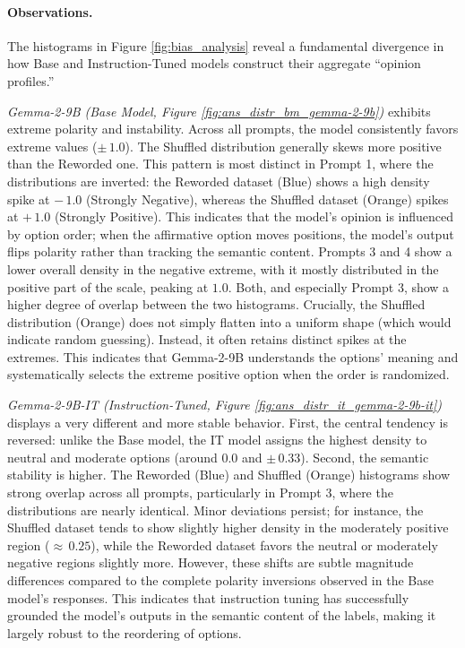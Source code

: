 \paragraph{Observations.}
The histograms in Figure \ref{fig:bias_analysis} reveal a fundamental divergence in how Base and Instruction-Tuned models construct their aggregate ``opinion profiles.''

\textit{Gemma-2-9B (Base Model, Figure \ref{fig:ans_distr_bm_gemma-2-9b})} exhibits extreme polarity and instability.
Across all prompts, the model consistently favors extreme values ($\pm\,1.0$). The Shuffled distribution generally skews more positive than the Reworded one. This pattern is most distinct in Prompt 1, where the distributions are inverted: the Reworded dataset (Blue) shows a high density spike at $-\,1.0$ (Strongly Negative), whereas the Shuffled dataset (Orange) spikes at $+\,1.0$ (Strongly Positive). This indicates that the model's opinion is influenced by option order; when the affirmative option moves positions, the model's output flips polarity rather than tracking the semantic content.
Prompts 3 and 4 show a lower overall density in the negative extreme, with it mostly distributed in the positive part of the scale, peaking at $1.0$. Both, and especially Prompt 3, show a higher degree of overlap between the two histograms.
Crucially, the Shuffled distribution (Orange) does not simply flatten into a uniform shape (which would indicate random guessing). Instead, it often retains distinct spikes at the extremes. This indicates that Gemma-2-9B understands the options' meaning and systematically selects the extreme positive option when the order is randomized.

\textit{Gemma-2-9B-IT (Instruction-Tuned, Figure \ref{fig:ans_distr_it_gemma-2-9b-it})} displays a very different and more stable behavior.
First, the central tendency is reversed: unlike the Base model, the IT model assigns the highest density to neutral and moderate options (around $0.0$ and $\pm\,0.33$).
Second, the semantic stability is higher. The Reworded (Blue) and Shuffled (Orange) histograms show strong overlap across all prompts, particularly in Prompt 3, where the distributions are nearly identical.
Minor deviations persist; for instance, the Shuffled dataset tends to show slightly higher density in the moderately positive region ($\approx\,0.25$), while the Reworded dataset favors the neutral or moderately negative regions slightly more. However, these shifts are subtle magnitude differences compared to the complete polarity inversions observed in the Base model's responses.
This indicates that instruction tuning has successfully grounded the model's outputs in the semantic content of the labels, making it largely robust to the reordering of options.

